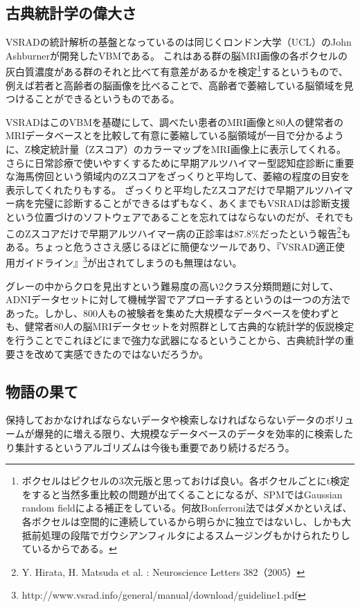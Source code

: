 \subsection{古典統計学の偉大さ}
VSRADの統計解析の基盤となっているのは同じくロンドン大学（UCL）のJohn Ashburnerが開発したVBMである。
これはある群の脳MRI画像の各ボクセルの灰白質濃度がある群のそれと比べて有意差があるかを検定\footnote{ボクセルはピクセルの3次元版と思っておけば良い。各ボクセルごとにt検定をすると当然多重比較の問題が出てくることになるが、SPMではGaussian random fieldによる補正をしている。何故Bonferroni法ではダメかといえば、各ボクセルは空間的に連続しているから明らかに独立ではないし、しかも大抵前処理の段階でガウシアンフィルタによるスムージングもかけられたりしているからである。}するというもので、例えば若者と高齢者の脳画像を比べることで、高齢者で萎縮している脳領域を見つけることができるというものである。

VSRADはこのVBMを基礎にして、調べたい患者のMRI画像と80人の健常者のMRIデータベースとを比較して有意に萎縮している脳領域が一目で分かるように、Z検定統計量（Zスコア）のカラーマップをMRI画像上に表示してくれる。
さらに日常診療で使いやすくするために早期アルツハイマー型認知症診断に重要な海馬傍回という領域内のZスコアをざっくりと平均して、萎縮の程度の目安を表示してくれたりもする。
ざっくりと平均したZスコアだけで早期アルツハイマー病を完璧に診断することができるはずもなく、あくまでもVSRADは診断支援という位置づけのソフトウェアであることを忘れてはならないのだが、それでもこのZスコアだけで早期アルツハイマー病の正診率は87.8\%だったという報告\footnote{Y. Hirata, H. Matsuda et al. : Neuroscience Letters 382（2005）}もある。ちょっと危うささえ感じるほどに簡便なツールであり、『VSRAD適正使用ガイドライン』\footnote{http://www.vsrad.info/general/manual/download/guideline1.pdf}が出されてしまうのも無理はない。

グレーの中からクロを見出すという難易度の高い2クラス分類問題に対して、ADNIデータセットに対して機械学習でアプローチするというのは一つの方法であった。しかし、800人もの被験者を集めた大規模なデータベースを使わずとも、健常者80人の脳MRIデータセットを対照群として古典的な統計学的仮説検定を行うことでこれほどにまで強力な武器になるということから、古典統計学の重要さを改めて実感できたのではないだろうか。
\subsection{物語の果て}
保持しておかなければならないデータや検索しなければならないデータのボリュームが爆発的に増える限り、大規模なデータベースのデータを効率的に検索したり集計するというアルゴリズムは今後も重要であり続けるだろう。

